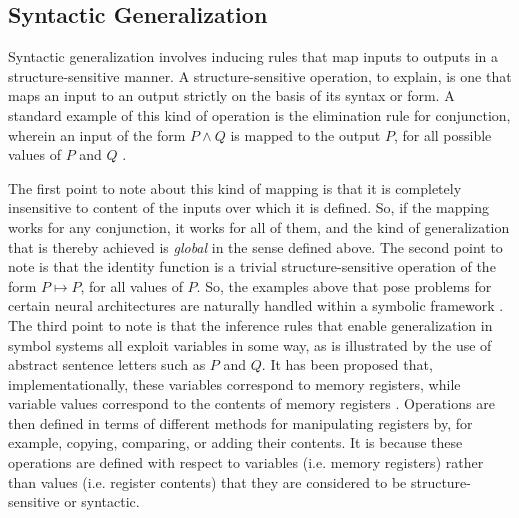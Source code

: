 \subsection{Syntactic Generalization}

Syntactic generalization involves inducing rules that map inputs to outputs in a structure-sensitive manner. A structure-sensitive operation, to explain, is one that maps an input to an output strictly on the basis of its syntax or form. A standard example of this kind of operation is the elimination rule for conjunction, wherein an input of the form $P \land Q$ is mapped to the output $P$, for all possible values of $P$ and $Q$ \citep{FodorPylyshyn:1988}. 

The first point to note about this kind of mapping is that it is completely insensitive to content of the inputs over which it is defined. So, if the mapping works for any conjunction, it works for all of them, and the kind of generalization that is thereby achieved is \textit{global} in the sense defined above. The second point to note is that the identity function is a trivial structure-sensitive operation of the form $P \mapsto P$, for all values of $P$. So, the examples above that pose problems for certain neural architectures are naturally handled within a symbolic framework \citep{Hadley:2009,Marcus:1998}. The third point to note is that the inference rules that enable generalization in symbol systems all exploit variables in some way, as is illustrated by the use of abstract sentence letters such as $P$ and $Q$. It has been proposed that, implementationally, these variables correspond to memory registers, while variable values correspond to the contents of memory registers \citep{Marcus:1998}. Operations are then defined in terms of different methods for manipulating registers by, for example, copying, comparing, or adding their contents. It is because these operations are defined with respect to variables (i.e. memory registers) rather than values (i.e. register contents) that they are considered to be structure-sensitive or syntactic.

